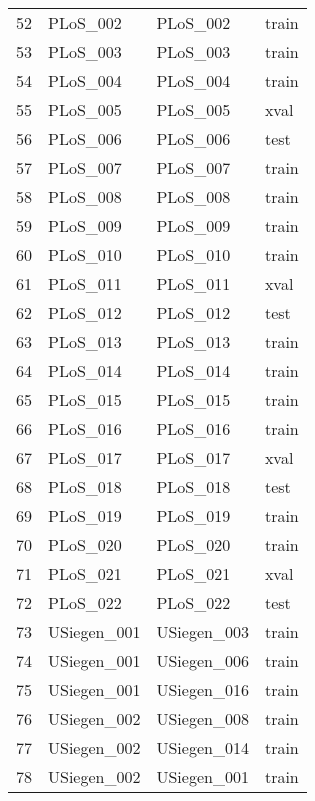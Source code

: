 \begin{tabular}{llll}
52  &          PLoS\_002 &          PLoS\_002 &  train \\
53  &          PLoS\_003 &          PLoS\_003 &  train \\
54  &          PLoS\_004 &          PLoS\_004 &  train \\
55  &          PLoS\_005 &          PLoS\_005 &   xval \\
56  &          PLoS\_006 &          PLoS\_006 &   test \\
57  &          PLoS\_007 &          PLoS\_007 &  train \\
58  &          PLoS\_008 &          PLoS\_008 &  train \\
59  &          PLoS\_009 &          PLoS\_009 &  train \\
60  &          PLoS\_010 &          PLoS\_010 &  train \\
61  &          PLoS\_011 &          PLoS\_011 &   xval \\
62  &          PLoS\_012 &          PLoS\_012 &   test \\
63  &          PLoS\_013 &          PLoS\_013 &  train \\
64  &          PLoS\_014 &          PLoS\_014 &  train \\
65  &          PLoS\_015 &          PLoS\_015 &  train \\
66  &          PLoS\_016 &          PLoS\_016 &  train \\
67  &          PLoS\_017 &          PLoS\_017 &   xval \\
68  &          PLoS\_018 &          PLoS\_018 &   test \\
69  &          PLoS\_019 &          PLoS\_019 &  train \\
70  &          PLoS\_020 &          PLoS\_020 &  train \\
71  &          PLoS\_021 &          PLoS\_021 &   xval \\
72  &          PLoS\_022 &          PLoS\_022 &   test \\
73  &       USiegen\_001 &       USiegen\_003 &  train \\
74  &       USiegen\_001 &       USiegen\_006 &  train \\
75  &       USiegen\_001 &       USiegen\_016 &  train \\
76  &       USiegen\_002 &       USiegen\_008 &  train \\
77  &       USiegen\_002 &       USiegen\_014 &  train \\
78  &       USiegen\_002 &       USiegen\_001 &  train \\

\end{tabular}
